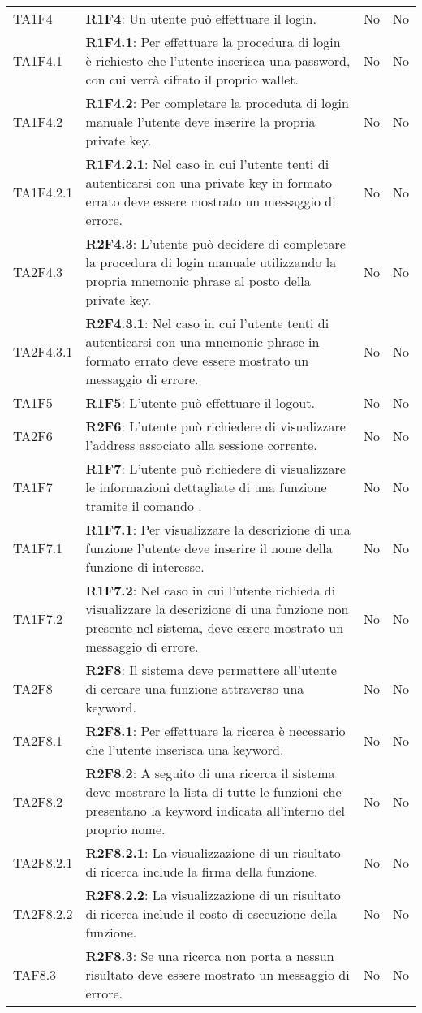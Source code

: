 \begin{longtable}{
		>{\centering}p{} 
		>{}p{}
		>{\centering}p{}
		>{\centering}p{} }
	TA1F4 		& \textbf{R1F4}: Un utente può effettuare il login. 									& No & No \tabularnewline
	TA1F4.1 		& \textbf{R1F4.1}: Per effettuare la procedura di login è richiesto che l'utente inserisca una password, con cui verrà cifrato il proprio wallet\ped{\textit{G}}. 						& No & No \tabularnewline
	TA1F4.2 		& \textbf{R1F4.2}: Per completare la proceduta di login manuale l'utente deve inserire la propria private key\ped{\textit{G}}. 															& No & No \tabularnewline
	TA1F4.2.1 	& \textbf{R1F4.2.1}: Nel caso in cui l'utente tenti di autenticarsi con una private key\ped{\textit{G}} in formato errato deve essere mostrato un messaggio di errore. 										& No & No \tabularnewline
	TA2F4.3 		& \textbf{R2F4.3}: L'utente può decidere di completare la procedura di login manuale utilizzando la propria mnemonic phrase\ped{\textit{G}} al posto della private key.					& No & No \tabularnewline
	TA2F4.3.1 	& \textbf{R2F4.3.1}: Nel caso in cui l'utente tenti di autenticarsi con una mnemonic phrase\ped{\textit{G}} in formato errato deve essere mostrato un messaggio di errore. 									& No & No \tabularnewline

	TA1F5 		& \textbf{R1F5}: L'utente può effettuare il logout. 																																	& No & No \tabularnewline

	TA2F6 		& \textbf{R2F6}: L'utente può richiedere di visualizzare l'address associato alla sessione corrente. 																					& No & No \tabularnewline

	TA1F7 		& \textbf{R1F7}: L'utente può richiedere di visualizzare le informazioni dettagliate di una funzione tramite il comando \info{}.		& No & No \tabularnewline
	TA1F7.1 		& \textbf{R1F7.1}: Per visualizzare la descrizione di una funzione l'utente deve inserire il nome della funzione di interesse.															& No & No \tabularnewline
	TA1F7.2 		& \textbf{R1F7.2}: Nel caso in cui l'utente richieda di visualizzare la descrizione di una funzione non presente nel sistema, deve essere mostrato un messaggio di	errore.			 			& No & No \tabularnewline

	TA2F8 		& \textbf{R2F8}: Il sistema deve permettere all'utente di cercare una funzione attraverso una keyword. 																					& No & No \tabularnewline
	TA2F8.1 		& \textbf{R2F8.1}: Per effettuare la ricerca è necessario che l'utente inserisca una keyword. 																							& No & No \tabularnewline
	TA2F8.2 		& \textbf{R2F8.2}: A seguito di una ricerca il sistema deve mostrare la lista di	tutte le funzioni che presentano la keyword indicata all'interno del proprio nome.						& No & No \tabularnewline
	TA2F8.2.1 	& \textbf{R2F8.2.1}: La visualizzazione di un risultato di ricerca include	la firma della funzione.																						& No & No \tabularnewline
	TA2F8.2.2 	& \textbf{R2F8.2.2}: La visualizzazione di un risultato di ricerca include	il costo di esecuzione della funzione.																			& No & No \tabularnewline
	TAF8.3 		& \textbf{R2F8.3}: Se una ricerca non porta a nessun risultato deve essere mostrato un messaggio di errore. 																				& No & No \tabularnewline


\end{longtable}
